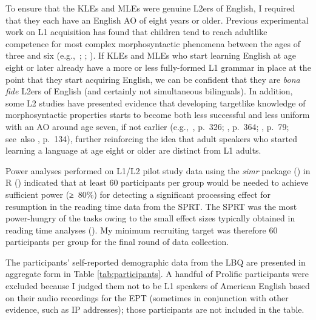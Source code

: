 To ensure that the KLEs and MLEs were genuine L2ers of English, I required that they each have an English AO of eight years or older. Previous experimental work on L1 acquisition has found that children tend to reach adultlike competence for most complex morphosyntactic phenomena between the ages of three and six (e.g.,~\cite{aravind.etal2018}; \cite{crain.thornton2012}; \cite{kazanina.phillips2001}). If KLEs and MLEs who start learning English at age eight or later already have a more or less fully-formed L1 grammar in place at the point that they start acquiring English, we can be confident that they are \textit{bona fide} L2ers of English (and certainly not simultaneous bilinguals). In addition, some L2 studies have presented evidence that developing targetlike knowledge of morphosyntactic properties starts to become both less successful and less uniform with an AO around age seven, if not earlier (e.g.,~\cite{granena.long2013}, p.~326; \cite{hyltenstam1992}, p.~364; \cite{johnson.newport1989}, p.~79; see~also \cite{sadeghi2022}, p.~134), further reinforcing the idea that adult speakers who started learning a language at age eight or older are distinct from L1 adults.

Power analyses performed on L1/L2 pilot study data using the \textit{simr} package (\cite{green.macleod2016}) in R (\cite{rcoreteam2023}) indicated that at least 60 participants per group would be needed to achieve sufficient power (≥~80\%) for detecting a significant processing effect for resumption in the reading time data from the SPRT. The SPRT was the most power-hungry of the tasks owing to the small effect sizes typically obtained in reading time analyses (\cite{avery.marsden2019}). My minimum recruiting target was therefore 60 participants per group for the final round of data collection. 

The participants' self-reported demographic data from the LBQ are presented in aggregate form in Table \ref{tab:participants}. A handful of Prolific participants were excluded because I judged them not to be L1 speakers of American English based on their audio recordings for the EPT (sometimes in conjunction with other evidence, such as IP addresses); those participants are not included in the table.

